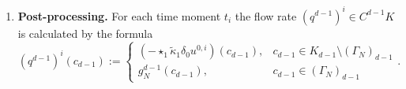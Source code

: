 \begin{algorithm}
\begin{enumerate}
\begin{itemize}
          the solution $\overline{x}^{i + 1}$ on the non-Dirichlet nodes
          (allocated only once, there is no need to store it on every step),
          \begin{equation}
            \overline{x}^{i + 1} := \overline{w_\tau}^i + \overline{z_\tau};
          \end{equation}
        \item
          the final solution
          \begin{equation}
            x^{i + 1}_j :=
            \begin{cases}
              \overline{x}^{i + 1}_j, & j \in J \\
              g_D^0(N_j), & j \in I
            \end{cases}.
          \end{equation}
      \end{itemize}
    \item
      \textbf{Post-processing.}
      For each time moment $t_i$ the flow rate $(q^{d - 1})^i \in C^{d - 1} K$
      is calculated by the formula
      \begin{equation}
        (q^{d - 1})^i(c_{d - 1}) :=
        \begin{cases}
          (- \star_1 \tilde{\kappa}_1 \delta_0 u^{0,i})(c_{d - 1}),
          & c_{d - 1} \in K_{d - 1} \setminus (\Gamma_N)_{d - 1} \\
          g_N^{d - 1}(c_{d - 1}), & c_{d - 1} \in (\Gamma_N)_{d - 1}
        \end{cases}.
      \end{equation}
  \end{enumerate}
\end{algorithm}

